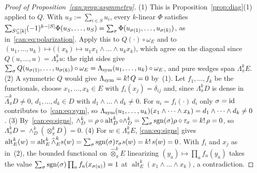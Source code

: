 \begin{proof}[Proof of Proposition~\ref{can:prop:asymmetry}]
(1) This is Proposition~\ref{prop:diag}(1) applied to $Q$. With $u_S:=\sum_{i\in S}u_i$, every $k$\nobreakdash-linear
$\Phi$ satisfies $\sum_{S\subseteq[k]}(-1)^{k-\lvert S\rvert}\Phi(u_S,\dots,u_S)=\sum_\sigma\Phi(u_{\sigma(1)},\dots,u_{\sigma(k)})$,
as in~\eqref{can:eq:polarization}. Apply this to $Q(\cdot)\circ\omega_E$ and to
$(u_1,\dots,u_k)\mapsto\bigl((x_b)\mapsto u_1x_1\wedge\dots\wedge u_kx_k\bigr)$, which agree on the diagonal since
$Q(u,\dots,u)=\Lambda^k_\pi u$: the right sides give
$\sum_\sigma Q(u_{\sigma(1)},\dots,u_{\sigma(k)})\circ\omega_E=\Lambda_{\mathrm{sym}}(u_1,\dots,u_k)\circ\omega_E$, and pure wedges span
$\Lambda^k_\pi E$.
(2) A symmetric $Q$ would give $\Lambda_{\mathrm{sym}}=k!\,Q=0$ by~(1). Let $f_1,\dots,f_k$ be the functionals, choose
$x_1,\dots,x_k\in E$ with $f_i(x_j)=\delta_{ij}$ and, since $\Lambda^k_\pi D$ is dense in $\widehat\Lambda^k_\pi D\ne0$,
$d_1,\dots,d_k\in D$ with $d_1\wedge\dots\wedge d_k\ne0$. For $u_i=f_i(\cdot)\,d_i$ only $\sigma=\mathrm{id}$ contributes
to~\eqref{can:eq:sym}, so $\Lambda_{\mathrm{sym}}(u_1,\dots,u_k)(x_1\wedge\dots\wedge x_k)=d_1\wedge\dots\wedge d_k\ne0$.
(3) By~\eqref{can:eq:signs},
$\wedge^k_D=\rho\circ\operatorname{alt}^k_D\circ\wedge^k_D=\sum_\sigma\operatorname{sgn}(\sigma)\rho\circ\tau_\sigma=k!\,\rho=0$, so
$\Lambda^k_\pi D=\wedge^k_D(\otimes^k_\pi D)=0$.
(4) For $w\in\Lambda^k_\pi E$, \eqref{can:eq:signs} gives
$\operatorname{alt}^k_E(w)=\operatorname{alt}^k_E\widehat\wedge^k_Es(w)=\sum_\sigma\operatorname{sgn}(\sigma)\tau_\sigma s(w)=k!\,s(w)=0$.
With $f_i$ and $x_j$ as in~(2), the bounded functional on $\widehat\otimes^k_\pi E$ linearizing
$(y_a)\mapsto\prod_af_a(y_a)$ takes the value $\sum_\sigma\operatorname{sgn}(\sigma)\prod_af_a(x_{\sigma(a)})=1$ at
$\operatorname{alt}^k_E(x_1\wedge\dots\wedge x_k)$, a contradiction.
\end{proof}
